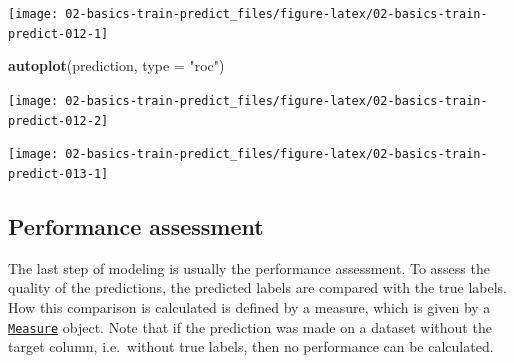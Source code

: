 \documentclass[]{scrbook}
\newenvironment{Shaded}{\begin{snugshade}}{\end{snugshade}}
\newcommand{\CommentTok}[1]{\textcolor[rgb]{0.56,0.35,0.01}{\textit{#1}}}
\newcommand{\DataTypeTok}[1]{\textcolor[rgb]{0.13,0.29,0.53}{#1}}
\newcommand{\KeywordTok}[1]{\textcolor[rgb]{0.13,0.29,0.53}{\textbf{#1}}}
\newcommand{\NormalTok}[1]{#1}
\newcommand{\OperatorTok}[1]{\textcolor[rgb]{0.81,0.36,0.00}{\textbf{#1}}}
\newcommand{\StringTok}[1]{\textcolor[rgb]{0.31,0.60,0.02}{#1}}
\renewenvironment{Shaded} {\begin{snugshade}\small} {\end{snugshade}}
\begin{document}
\begin{center}\texttt{[image: 02-basics-train-predict\_files/figure-latex/02-basics-train-predict-012-1]} \end{center}

\begin{Shaded}
\begin{Highlighting}[]
\KeywordTok{autoplot}\NormalTok{(prediction, }\DataTypeTok{type =} \StringTok{"roc"}\NormalTok{)}
\end{Highlighting}
\end{Shaded}

\begin{center}\texttt{[image: 02-basics-train-predict\_files/figure-latex/02-basics-train-predict-012-2]} \end{center}

\begin{Shaded}
\end{Shaded}

\begin{center}\texttt{[image: 02-basics-train-predict\_files/figure-latex/02-basics-train-predict-013-1]} \end{center}

\hypertarget{measure}{%
\subsection{Performance assessment}\label{measure}}

The last step of modeling is usually the performance assessment.
To assess the quality of the predictions, the predicted labels are compared with the true labels.
How this comparison is calculated is defined by a measure, which is given by a \href{https://mlr3.mlr-org.com/reference/Measure.html}{\texttt{Measure}} object.
Note that if the prediction was made on a dataset without the target column, i.e.~without true labels, then no performance can be calculated.
\end{document}
